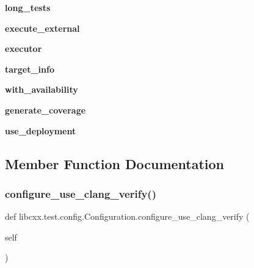 \begin{DoxyCompactItemize}
{\bfseries long\+\_\+tests}
\item 
\mbox{\label{classlibcxx_1_1test_1_1config_1_1_configuration_ad2754e52fdc39e88776a6d6064e689a1}} 
{\bfseries execute\+\_\+external}
\item 
\mbox{\label{classlibcxx_1_1test_1_1config_1_1_configuration_a6133fc926dcda135fb181673443ebb84}} 
{\bfseries executor}
\item 
\mbox{\label{classlibcxx_1_1test_1_1config_1_1_configuration_a7087c73ed59147e09e737b5caa443e4d}} 
{\bfseries target\+\_\+info}
\item 
\mbox{\label{classlibcxx_1_1test_1_1config_1_1_configuration_a2475856e70c2475635c2d895bc5ff804}} 
{\bfseries with\+\_\+availability}
\item 
\mbox{\label{classlibcxx_1_1test_1_1config_1_1_configuration_a4a2d1d13c966063432bb95bb0d4798a8}} 
{\bfseries generate\+\_\+coverage}
\item 
\mbox{\label{classlibcxx_1_1test_1_1config_1_1_configuration_a02d30bde2162c49583dae63deee0ca36}} 
{\bfseries use\+\_\+deployment}
\end{DoxyCompactItemize}


\subsection{Member Function Documentation}
\mbox{\label{classlibcxx_1_1test_1_1config_1_1_configuration_a467037575dc115589db849ae05812c62}} 
\subsubsection{\texorpdfstring{configure\+\_\+use\+\_\+clang\+\_\+verify()}{configure\_use\_clang\_verify()}}
{\footnotesize\ttfamily def libcxx.\+test.\+config.\+Configuration.\+configure\+\_\+use\+\_\+clang\+\_\+verify (\begin{DoxyParamCaption}\item[{}]{self }\end{DoxyParamCaption})}

